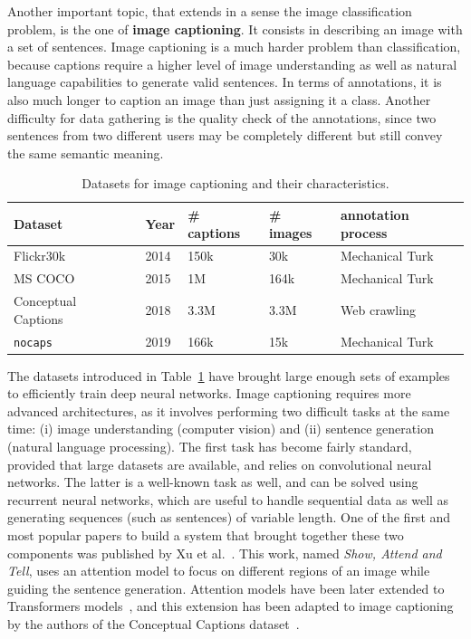 Another important topic, that extends in a sense the image classification problem,
is the one of \textbf{image captioning}.
It consists in describing an image with a set of sentences.
Image captioning is a much harder problem than classification,
because captions require a higher level of image understanding as well as
natural language capabilities to generate valid sentences.
In terms of annotations, it is also much longer to caption
an image than just assigning it a class.
Another difficulty for data gathering is the quality check of the annotations,
since two sentences from two different users may be
completely different but still convey the same semantic meaning.

\begin{table}
\centering
\caption{Datasets for image captioning and their characteristics.}
\begin{tabular}{lllll}
	Dataset & Year & \# captions & \# images & annotation process \\
	\midrule
	Flickr30k~\cite{flickr30k} & 2014 & 150k & 30k & Mechanical Turk \\
	MS COCO~\cite{chen2015microsoft} & 2015 & 1M & 164k & Mechanical Turk \\
	Conceptual Captions~\cite{sharma-etal-2018-conceptual} & 2018 & 3.3M & 3.3M & Web crawling \\
	\texttt{nocaps}~\cite{agrawal2019nocaps} & 2019 &  166k & 15k & Mechanical Turk \\
\end{tabular}%
\label{tab:caption_ds}
\end{table}

The datasets introduced in Table~\ref{tab:caption_ds} have brought
large enough sets of examples to efficiently train deep neural networks.
Image captioning requires more advanced architectures,
as it involves performing two difficult tasks at the same time:
(i) image understanding (computer vision) and
(ii) sentence generation (natural language processing).
The first task has become fairly standard, provided that large datasets are available,
and relies on convolutional neural networks.
The latter is a well-known task as well,
and can be solved using recurrent neural networks,
which are useful to handle sequential data as well as generating sequences
(such as sentences) of variable length.
One of the first and most popular papers to build a system
that brought together these two components was published by Xu et al.~\cite{xu2015show}.
This work, named \textit{Show, Attend and Tell}, uses an attention model
to focus on different regions of an image while guiding the sentence generation.
Attention models have been later extended to
Transformers models~\cite{vaswani2017attention},
and this extension has been adapted to image captioning by
the authors of the Conceptual Captions dataset~\cite{sharma-etal-2018-conceptual}.

